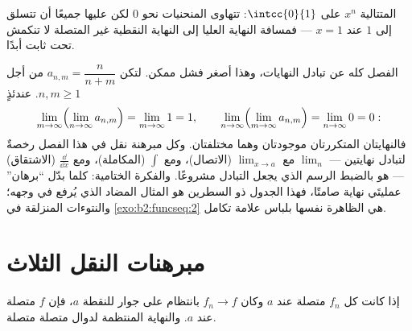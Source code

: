 \begin{omfigure}

{\small المتتالية $x^n$ على $\intcc{0}{1}$: تتهاوى المنحنيات نحو
$0$ لكن عليها جميعًا أن تتسلق إلى $1$ عند $x = 1$ --- فمسافة النهاية العليا إلى
النهاية النقطية غير المتصلة لا تنكمش تحت ثابت أبدًا.}
\end{omfigure}

\begin{example}\label{ex:b2:funcseq:doublelimit}
الفصل كله عن تبادل النهايات، وهذا أصغر
فشل ممكن. لتكن $a_{n,m} = \dfrac{n}{n+m}$ من أجل
$n, m \geq 1$. عندئذٍ
\[
\lim_{m\to\infty}\Bigl(\lim_{n\to\infty}a_{n,m}\Bigr)
= \lim_{m\to\infty} 1 = 1,
\qquad
\lim_{n\to\infty}\Bigl(\lim_{m\to\infty}a_{n,m}\Bigr)
= \lim_{n\to\infty} 0 = 0 :
\]
فالنهايتان المتكررتان موجودتان وهما مختلفتان. وكل مبرهنة نقل
في هذا الفصل رخصةٌ لتبادل نهايتين ---
$\lim_n$ مع $\lim_{x\to a}$ (الاتصال)، ومع $\int$
(المكاملة)، ومع $\frac{\dd}{\dd x}$ (الاشتقاق) ---
 هو بالضبط الرسم الذي يجعل التبادل
مشروعًا. والفكرة الختامية: كلما بدّل ``برهان''
عمليتَي نهاية صامتًا، فهذا الجدول ذو السطرين هو
المثال المضاد الذي يُرفع في وجهه؛ والنتوءات المنزلقة في
\cref{exo:b2:funcseq:2} هي الظاهرة نفسها بلباس علامة
تكامل.
\end{example}

\section{مبرهنات النقل الثلاث}

\begin{theorem}[الاتصال]\label{thm:b2:funcseq:continuity}
إذا كانت كل $f_n$ متصلة عند $a$ وكان $f_n \to f$ بانتظام على
جوار للنقطة $a$، فإن $f$ متصلة عند $a$. والنهاية المنتظمة
لدوال متصلة متصلة.
\end{theorem}

